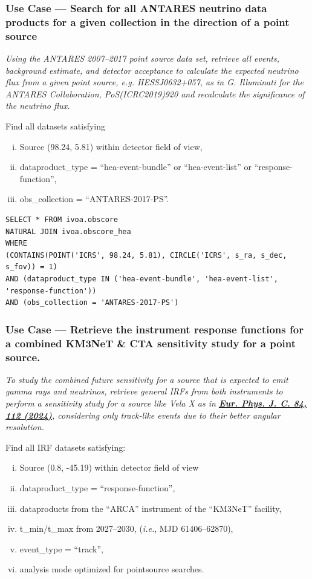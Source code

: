 \subsubsection{Use Case --- Search for all ANTARES neutrino data products for a given collection in the direction of a point source}

{\em Using the ANTARES 2007--2017 point source data set, retrieve all events, background estimate, and detector acceptance to calculate the expected neutrino flux from a given point source, e.g. HESSJ0632+057, as in \textit{G. Illuminati for the ANTARES Collaboration, PoS(ICRC2019)920} and recalculate the significance of the neutrino flux.}

\medskip
\noindent Find all datasets satisfying
\begin{enumerate}[(i)]
  \item Source (98.24, 5.81) within detector field of view,
  \item dataproduct\_type = ``hea-event-bundle'' or ``hea-event-list'' or ``response-function'',
  \item obs\_collection = ``ANTARES-2017-PS''.
\end{enumerate}

\begin{verbatim}
SELECT * FROM ivoa.obscore
NATURAL JOIN ivoa.obscore_hea
WHERE
(CONTAINS(POINT('ICRS', 98.24, 5.81), CIRCLE('ICRS', s_ra, s_dec, s_fov)) = 1)
AND (dataproduct_type IN ('hea-event-bundle', 'hea-event-list', 
'response-function'))
AND (obs_collection = 'ANTARES-2017-PS')
\end{verbatim}

\subsubsection{Use Case --- Retrieve the instrument response functions for a combined KM3NeT \& CTA sensitivity study for a point source.}

{\em To study the combined future sensitivity for a source that is expected to emit gamma rays and neutrinos, retrieve general IRFs from both instruments to perform a sensitivity study for a source like Vela X as in \textbf{\hyperref[https://doi.org/10.1140/epjc/s10052-023-12279-z]{Eur. Phys. J. C. 84, 112 (2024)}}, considering only track-like events due to their better angular resolution.}

\medskip
\noindent Find all IRF datasets satisfying:
\begin{enumerate}[(i)]
  \item Source (0.8, -45.19) within detector field of view
  \item dataproduct\_type = ``response-function'',
  \item dataproducts from the ``ARCA'' instrument of the ``KM3NeT'' facility,
  \item t\_min/t\_max from 2027--2030, ({\em i.e.\/}, MJD 61406--62870),
  \item event\_type = ``track'',
  \item analysis mode optimized for pointsource searches.
\end{enumerate}

